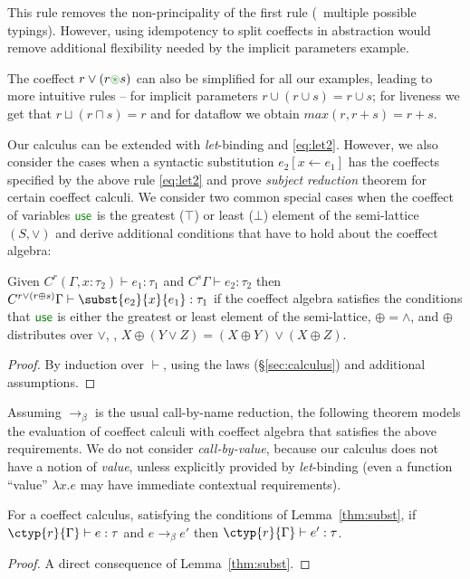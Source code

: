 This rule removes the non-principality of the first rule
(\ie~multiple possible typings).  However, using idempotency 
to split coeffects in abstraction would remove additional
flexibility needed by the implicit parameters example.

The coeffect $r \vee (r \cseq s)$ can
also be simplified for all our examples, leading to more intuitive
rules -- for implicit parameters $r \cup (r \cup s) = r \cup s$; for
liveness we get that $r \sqcup (r \sqcap s) = r$ and for dataflow we
obtain $\textit{max}(r, r+s) = r + s$.

Our calculus can be extended with \emph{let}-binding and \eqref{eq:let2}.
However, we also consider the cases when a
syntactic substitution $e_2[x \leftarrow e_1]$ has the coeffects
specified by the above rule \eqref{eq:let2} 
and prove \emph{subject reduction} theorem
for certain coeffect calculi.  We consider two common special cases
when the coeffect of variables $\cunit$ is the greatest ($\top$) or
least ($\bot$) element of the semi-lattice $(S, \vee)$ and derive
additional conditions that have to hold about the coeffect algebra:

\begin{lemma}[Substitution]
\label{thm:subst}
Given $C^r (\Gamma, x : \tau_2) \vdash e_1 : \tau_1$ and $C^s \Gamma \vdash e_2 : \tau_2$
then $C^{r \vee (r \oplus s)} \Gamma \vdash \subst{e_2}{x}{e_1} : \tau_1$ if 
the coeffect algebra satisfies the conditions that 
$\cunit$ is either the greatest or least element of the semi-lattice,
$\oplus = \wedge$, and $\oplus$ distributes over $\vee$,
\ie{}, $X \oplus (Y \vee Z) = (X \oplus Y) \vee (X \oplus Z)$.
\end{lemma}

\begin{proof}
By induction over $\vdash$, using the laws (\S\ref{sec:calculus}) and additional assumptions.
\end{proof}

Assuming $\rightarrow_\beta$ is the usual call-by-name reduction, the
following theorem models the evaluation of coeffect calculi with
coeffect algebra that satisfies the above requirements. We do not
consider \emph{call-by-value}, because our calculus does not have a
notion of \emph{value}, unless explicitly provided by
\emph{let}-binding (even a function ``value'' $\lambda x.e$ may have
immediate contextual requirements).

\begin{theorem}
\label{thm:reduction}
For a coeffect calculus, satisfying the conditions of Lemma~\ref{thm:subst}, if
$\ctyp{r}{\Gamma} \vdash e : \tau$ and $e \rightarrow_\beta e'$ then 
$\ctyp{r}{\Gamma} \vdash e' : \tau$.
\end{theorem}
\begin{proof}
A direct consequence of Lemma~\ref{thm:subst}. 
\end{proof}

